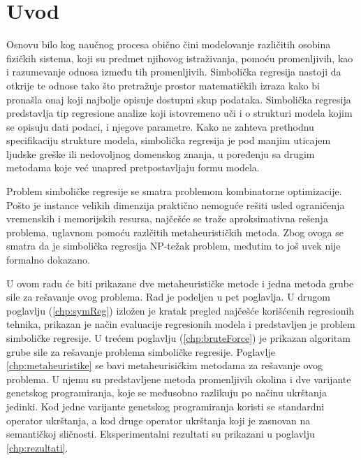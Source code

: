 \documentclass[12pt,oneside]{memoir}
\begin{document}
\frontmatter
\naslovna
\komisija

\apstrakt
\tableofcontents*

\mainmatter

\chapter{Uvod}

Osnovu bilo kog naučnog procesa obično čini modelovanje različitih osobina fizičkih sistema, koji su predmet njihovog istraživanja, pomoću promenljivih, kao i razumevanje odnosa između tih promenljivih. Simbolička regresija nastoji da otkrije te odnose tako što pretražuje prostor matematičkih izraza kako bi pronašla onaj koji najbolje opisuje dostupni skup podataka. Simbolička regresija predstavlja tip regresione analize koji istovremeno uči i o strukturi modela kojim se opisuju dati podaci, i njegove parametre. Kako ne zahteva prethodnu specifikaciju strukture modela, simbolička regresija je pod manjim uticajem ljudske greške ili nedovoljnog domenskog znanja, u poređenju sa drugim metodama koje već unapred pretpostavljaju formu modela.

Problem simboličke regresije se smatra problemom kombinatorne optimizacije. Pošto je instance velikih dimenzija praktično nemoguće rešiti usled ograničenja vremenskih i memorijskih resursa, najčešće se traže aproksimativna rešenja problema, uglavnom pomoću razlčitih metaheurističkih metoda. Zbog ovoga se smatra da je simbolička regresija NP-težak problem, međutim to još uvek nije formalno dokazano.

U ovom radu će biti prikazane dve metaheurističke metode i jedna metoda grube sile za rešavanje ovog problema. Rad je podeljen u pet poglavlja. U drugom poglavlju (\ref{chp:symReg}) izložen je kratak pregled najčešće korišćenih regresionih tehnika, prikazan je način evaluacije regresionih modela i predstavljen je problem simboličke regresije. U trećem poglavlju (\ref{chp:bruteForce}) je prikazan algoritam grube sile za rešavanje problema simboličke regresije. Poglavlje \ref{chp:metaheuristike} se bavi metaheurisičkim metodama za rešavanje ovog problema. U njemu su predstavljene metoda promenljivih okolina i dve varijante genetskog programiranja, koje se međusobno razlikuju po načinu ukrštanja jedinki. Kod jedne varijante genetskog programiranja koristi se standardni operator ukrštanja, a kod druge operator ukrštanja koji je zasnovan na semantičkoj sličnosti. Eksperimentalni rezultati su prikazani u poglavlju \ref{chp:rezultati}.
\end{document}
